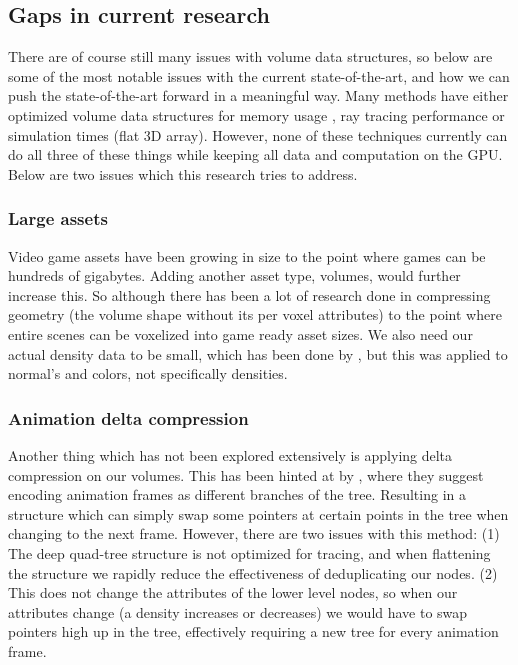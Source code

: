 \clearpage\subsection{Gaps in current research} \label{related_work:gaps_in_current_research}
There are of course still many issues with volume data structures, so below are some of the most notable issues with the current state-of-the-art, and how we can push the state-of-the-art forward in a meaningful way. Many methods have either optimized volume data structures for memory usage \cite{laine2010efficient}\cite{kampe2013high}, ray tracing performance \cite{van2015real} \cite{soderlund2022ray} \cite{museth2013vdb} or simulation times (flat 3D array). However, none of these techniques currently can do all three of these things while keeping all data and computation on the GPU. Below are two issues which this research tries to address.
\subsubsection{Large assets} \label{related_work:gaps_in_current_research:large_assets}
Video game assets have been growing in size to the point where games can be hundreds of gigabytes. Adding another asset type, volumes, would further increase this. So although there has been a lot of research done in compressing geometry (the volume shape without its per voxel attributes) to the point where entire scenes can be voxelized into game ready asset sizes\cite{van2015real}\cite{museth2013vdb}. We also need our actual density data to be small, which has been done by \cite{dado2016geometry}, but this was applied to normal's and colors, not specifically densities.
\subsubsection{Animation delta compression} \label{related_work:gaps_in_current_research:animation_delta_compression}
Another thing which has not been explored extensively is applying delta compression on our volumes. This has been hinted at by \cite{careil2020interactively}, where they suggest encoding animation frames as different branches of the tree. Resulting in a structure which can simply swap some pointers at certain points in the tree when changing to the next frame. However, there are two issues with this method: (1) The deep quad-tree structure is not optimized for tracing, and when flattening the structure we rapidly reduce the effectiveness of deduplicating our nodes. (2) This does not change the attributes of the lower level nodes, so when our attributes change (a density increases or decreases) we would have to swap pointers high up in the tree, effectively requiring a new tree for every animation frame.
